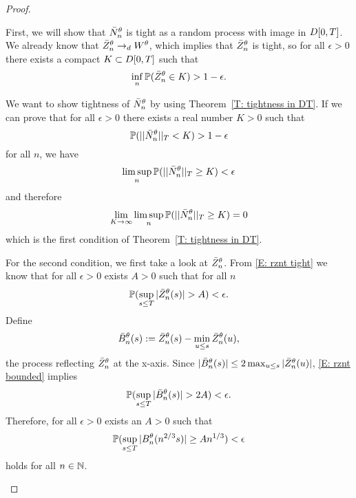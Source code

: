 \begin{proof}
\begin{proofpart}
First, we will show that $\bar{N}_n^{\theta}$ is tight as a random process with image in $D[0, T]$.
We already know that $\bar{Z}^{\theta}_n \rightarrow_d W^{\theta}$, which implies that $\bar{Z}^{\theta}_n$ is tight, 
so for all $\epsilon>0$ there exists a compact $K \subset D[0, T]$ such that
\begin{equation} \label{E: rznt tight}
\inf_n \mathbb{P} ( \bar{Z}^{\theta}_n \in K) > 1 - \epsilon.
\end{equation}

We want to show tightness of $\bar{N}_n^{\theta}$ by using Theorem~\ref{T: tightness in DT}.
If we can prove that for all $\epsilon > 0$ there exists a real number $K > 0$ such that
\begin{equation}
	\mathbb{P}(||\bar{N}_n^{\theta}||_T < K) > 1 - \epsilon
\end{equation}
for all $n$, we have
\begin{equation}
	\limsup_n \mathbb{P}(||\bar{N}_n^{\theta}||_T \geq K) < \epsilon
\end{equation}
and therefore
\begin{equation}
	\lim_{K \rightarrow \infty} \limsup_n \mathbb{P}(||\bar{N}_n^{\theta}||_T \geq K) = 0
\end{equation}
which is the first condition of Theorem~\ref{T: tightness in DT}.

For the second condition, we first take a look at $\bar{Z}^{\theta}_n$.
From \eqref{E: rznt tight} we know that for all $\epsilon > 0$ exists $A>0$ such that for all $n$
\begin{equation} \label{E: rznt bounded}
\mathbb{P}(\sup_{s \leq T} |\bar{Z}^{\theta}_n(s)| > A) < \epsilon.
\end{equation}
Define 
\begin{equation}
	\bar{B}_n^{\theta}(s) := \bar{Z}^{\theta}_n(s) - \min_{u \leq s}\bar{Z}^{\theta}_n(u),
\end{equation}
the process reflecting $\bar{Z}^{\theta}_n$ at the x-axis.
Since $|\bar{B}_n^{\theta}(s)| \leq 2\max_{u \leq s}|\bar{Z}^{\theta}_n(u)|$, \eqref{E: rznt bounded} implies
\begin{equation} \label{E: rzminz bounded}
\mathbb{P}(\sup_{s \leq T} |\bar{B}_n^{\theta}(s)| > 2A) < \epsilon.
\end{equation}
Therefore, for all $\epsilon > 0$ exists an $A>0$ such that
\begin{equation}
\mathbb{P}( \sup_{s \leq T} |B_n^{\theta}(n^{2 / 3}s)| \geq An^{1 / 3} ) < \epsilon
\end{equation}
holds for all $n \in \mathbb{N}$.


\end{proofpart}
\end{proof}
